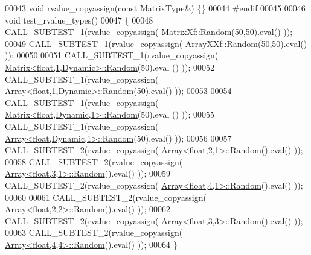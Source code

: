 \begin{DoxyCode}
00043 \textcolor{keywordtype}{void} rvalue\_copyassign(\textcolor{keyword}{const} MatrixType&) \{\}
00044 \textcolor{preprocessor}{#endif}
00045 
00046 \textcolor{keywordtype}{void} test\_rvalue\_types()
00047 \{
00048   CALL\_SUBTEST\_1(rvalue\_copyassign( MatrixXf::Random(50,50).eval() ));
00049   CALL\_SUBTEST\_1(rvalue\_copyassign( ArrayXXf::Random(50,50).eval() ));
00050 
00051   CALL\_SUBTEST\_1(rvalue\_copyassign( \hyperlink{group___core___module_class_eigen_1_1_matrix}{Matrix<float,1,Dynamic>::Random}(50).eval
      () ));
00052   CALL\_SUBTEST\_1(rvalue\_copyassign( \hyperlink{group___core___module_class_eigen_1_1_array}{Array<float,1,Dynamic>::Random}(50).eval()
       ));
00053 
00054   CALL\_SUBTEST\_1(rvalue\_copyassign( \hyperlink{group___core___module_class_eigen_1_1_matrix}{Matrix<float,Dynamic,1>::Random}(50).eval
      () ));
00055   CALL\_SUBTEST\_1(rvalue\_copyassign( \hyperlink{group___core___module_class_eigen_1_1_array}{Array<float,Dynamic,1>::Random}(50).eval()
       ));
00056   
00057   CALL\_SUBTEST\_2(rvalue\_copyassign( \hyperlink{group___core___module_class_eigen_1_1_array}{Array<float,2,1>::Random}().eval() ));
00058   CALL\_SUBTEST\_2(rvalue\_copyassign( \hyperlink{group___core___module_class_eigen_1_1_array}{Array<float,3,1>::Random}().eval() ));
00059   CALL\_SUBTEST\_2(rvalue\_copyassign( \hyperlink{group___core___module_class_eigen_1_1_array}{Array<float,4,1>::Random}().eval() ));
00060 
00061   CALL\_SUBTEST\_2(rvalue\_copyassign( \hyperlink{group___core___module_class_eigen_1_1_array}{Array<float,2,2>::Random}().eval() ));
00062   CALL\_SUBTEST\_2(rvalue\_copyassign( \hyperlink{group___core___module_class_eigen_1_1_array}{Array<float,3,3>::Random}().eval() ));
00063   CALL\_SUBTEST\_2(rvalue\_copyassign( \hyperlink{group___core___module_class_eigen_1_1_array}{Array<float,4,4>::Random}().eval() ));
00064 \}
\end{DoxyCode}
